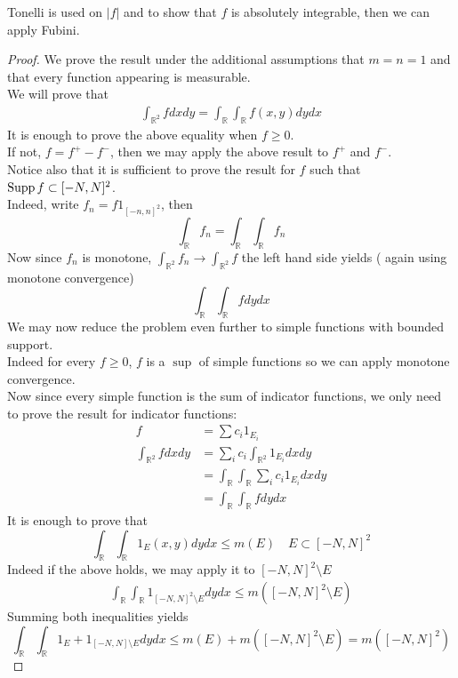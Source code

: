 \documentclass[../main.tex]{subfiles}
\begin{document}
\begin{rmq}
Tonelli is used on $|f|$ and to show that $f$ is absolutely integrable, then we can apply Fubini.
\end{rmq}
\begin{proof}
We prove the result under the additional assumptions that  $m=n=1$ and that every function appearing is measurable.\\
We will prove that
\begin{align*}
\int_{ \mathbb{R}^{2} }^{  } f dx dy = \int_\mathbb{R}\int_{ \mathbb{R}} f( x,y) dy dx
\end{align*}
It is enough to prove the above equality when $f \geq 0$.\\
If not, $f= f^{+}- f^{-}$, then we may apply the above result to $f^{+}$ and $f^{-}$.\\
Notice also that it is sufficient to prove the result for $f$ such that $\operatorname{Supp} f \subset [ -N,N]^{2}$.\\
Indeed, write $f_n =  f 1_{[-n,n]^{2}} $, then
\[ 
\int_{ \mathbb{R} }^{  } f_n = \int_{\mathbb{R}} \int_{ \mathbb{R}} f_n 
\]
Now since $f_n$	is monotone, $ \int_{ \mathbb{R}^{2} }^{  } f_n \to \int_{ \mathbb{R}^{2} }^{  }f$ the left hand side yields ( again using monotone convergence) 
\[ 
\int_{ \mathbb{R} }^{  } \int_{\mathbb{R}} f dy dx
\]
We may now reduce the problem even further to simple functions with bounded support.\\
Indeed for every $f \geq 0$, $f$ is a $\sup$ of simple functions so we can apply monotone convergence.\\
Now since every simple function is the sum of indicator functions, we only need to prove the result for indicator functions:
\begin{align*}
	f&= \sum c_i 1_{E_i} \\
	\int_{ \mathbb{R}^{2} }^{  } fdx dy &= \sum_{i}^{ } c_i \int_{ \mathbb{R}^{2} }^{  }1_{E_i} dx dy \\
					    &= \int_{ \mathbb{R} }^{  } \int_{ \mathbb{R} }^{  } \sum_{i}^{ } c_i 1_{E_i} dx dy\\
					    &= \int_{ \mathbb{R} }^{  } \int_{ \mathbb{R} }^{  }f dy dx
\end{align*}
It is enough to prove that
\[ 
\int_{ \mathbb{R} }^{  } \int_{ \mathbb{R} }^{  } 1_E ( x,y) dy dx \leq  m( E) \quad E \subset [ -N,N] ^{2}
\]
Indeed if the above holds, we may apply it to $[-N,N] ^{2} \setminus E$ 
\begin{align*}
\int_{ \mathbb{R} }^{  } \int_{ \mathbb{R} }^{  }1_{ [ -N,N]^{2}\setminus E} dy dx \leq  m( [ -N,N]^{2} \setminus E) 
\end{align*}
Summing both inequalities yields
\[ 
	\int_{ \mathbb{R} }^{  } \int_{ \mathbb{R} }^{  }1_E + 1_{[-N,N]\setminus E} dy dx \leq  m( E) + m( [ -N,N] ^{2}\setminus E) = m( [ -N,N] ^{2}) 	
\]
		

\end{proof}
\end{document}
